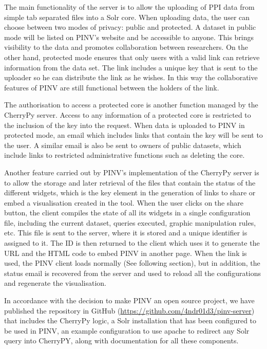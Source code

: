 The main functionality of the server is to allow the uploading of PPI data from simple tab separated files into a Solr core. When uploading data, the user can choose between two modes of privacy: public and protected. A dataset in public mode will be listed on PINV’s website and be accessible to anyone. This brings visibility to the data and promotes collaboration between researchers. On the other hand, protected mode ensures that only users with a valid link can retrieve information from the data set. The link includes a unique key that is sent to the uploader so he can distribute the link as he wishes. In this way the collaborative features of PINV are still functional between the holders of the link.

The authorisation to access a protected core is another function managed by the CherryPy server. Access to any information of a protected core is restricted to the inclusion of the key into the request. When data is uploaded to PINV in protected mode, an email which includes links that contain the key will be sent to the user. A similar email is also be sent to owners of public datasets, which include links to restricted administrative functions such as deleting the core.

Another feature carried out by PINV's implementation of the CherryPy server is to allow the storage and later retrieval of the files that contain the status of the different widgets, which is the key element in the generation of links to share or embed a visualisation created in the tool. When the user clicks on the share button, the client compiles the state of all its widgets in a single configuration file, including the current dataset, queries executed, graphic manipulation rules, etc. This file is sent to the server, where it is stored and a unique identifier is assigned to it. The ID is then returned to the client which uses it to generate the URL and the HTML code to embed PINV in another page. When the link is used, the PINV client loads normally (See following section), but in addition, the status email is recovered from the server and used to reload all the configurations and regenerate the visualisation.

In accordance with the decision to make PINV an open source project, we have published the repository in GitHub (\url{https://github.com/4ndr01d3/pinv-server}) that includes the CherryPy logic, a Solr installation that has been configured to be used in PINV, an example configuration to use apache to redirect any Solr query into CherryPY, along with documentation for all these components.

